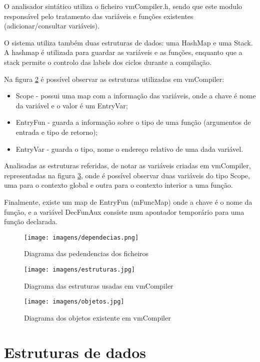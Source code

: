 \documentclass[a4paper,10pt]{report}
\begin{document}
    O analisador sintático utiliza o ficheiro vmCompiler.h, sendo que este modulo responsável pelo tratamento das variáveis e funções existentes (adicionar/consultar variáveis).

    O sistema utiliza também duas estruturas de dados: uma HashMap e uma Stack. A hashmap é utilizada para guardar as variáveis e as funções, enquanto que a stack permite o controlo das labels dos ciclos durante a compilação.

    Na figura \ref{fig:struct} é possível observar as estruturas utilizadas em vmCompiler:
    \begin{itemize}
      \item Scope - possui uma map com a informação das variáveis, onde a chave é nome da variável e o valor é um EntryVar;
      \item EntryFun - guarda a informação sobre o tipo de uma função (argumentos de entrada e tipo de retorno);
      \item EntryVar - guarda o tipo, nome o endereço relativo de uma dada variável.
    \end{itemize}

    Analisadas as estruturas referidas, de notar as variáveis criadas em vmCompiler, representadas na figura \ref{fig:objs}, onde é possível observar duas variáveis do tipo Scope, uma para o contexto global e outra para o contexto interior a uma função.

    Finalmente, existe um map de EntryFun (mFuncMap) onde a chave é o nome da função, e a variável DecFunAux consiste num apontador temporário para uma função declarada.

\begin{figure}
\centering
\texttt{[image: imagens/dependecias.png]}
\caption{Diagrama das pedendencias dos ficheiros}
\label{fig:dependencias}
\end{figure}

\begin{figure}
\centering
\texttt{[image: imagens/estruturas.jpg]}
\caption{Diagrama das estruturas usadas em vmCompiler}
\label{fig:struct}
\end{figure}

\begin{figure}
\centering
\texttt{[image: imagens/objetos.jpg]}
\caption{Diagrama dos objetos existente em vmCompiler}
\label{fig:objs}
\end{figure}



\section{Estruturas de dados}
\end{document}
